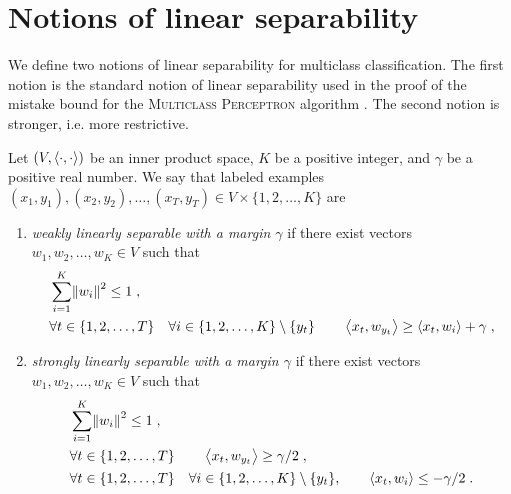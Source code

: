 \section{Notions of linear separability}
\label{section:notions-of-linear-separability}

We define two notions of linear separability for multiclass classification. The
first notion is the standard notion of linear separability used in the proof of
the mistake bound for the \textsc{Multiclass Perceptron} algorithm \citep[see e.g.][]{Crammer-Singer-2003}. The second
notion is stronger, i.e. more restrictive. %

\begin{definition}
\label{definition:linear-separability}
Let $(V,\left\langle \cdot, \cdot \right\rangle)$ be an inner product space, $K$ be a positive
integer, and $\gamma$ be a positive real number.
We say that labeled examples $(x_1, y_1),
(x_2, y_2), \dots, (x_T, y_T) \in V \times \{1,2,\dots,K\}$ are
\begin{enumerate}
\item
\emph{weakly linearly separable with a margin $\gamma$} if there exist vectors
$w_1, w_2, \dots, w_K \in V$ such that
\begin{align}
\label{equation:weak-linear-separability-1}
& \sum_{i=1}^K \norm{w_i}^2 \le 1 \; , \\
\label{equation:weak-linear-separability-2}
& \begin{gathered}
\forall t \in \{1,2,\dots,T\} \quad \forall i \in \{1,2,\dots, K\} \setminus \{y_t\} \qquad
\left\langle x_t, w_{y_t} \right\rangle \ge \left\langle x_t, w_i \right\rangle + \gamma \; ,
\end{gathered}
\end{align}
\item
\emph{strongly linearly separable with a margin $\gamma$} if there exist vectors
$w_1, w_2, \dots, w_K \in V$ such that
\begin{align}
\label{equation:strong-linear-separability-1}
& \sum_{i=1}^K \norm{w_i}^2 \le 1 \; , \\
\label{equation:strong-linear-separability-2}
& \forall t \in \{1,2,\dots,T\} \qquad \left\langle x_t, w_{y_t} \right\rangle \ge \gamma/2 \; , \\
\label{equation:strong-linear-separability-3}
& \begin{gathered}
\forall t \in \{1,2,\dots,T\} \quad \forall i \in \{1,2,\dots, K\} \setminus \{y_t\}, \qquad
\left\langle x_t, w_i \right\rangle \le - \gamma/2 \; .
\end{gathered}
\end{align}
\end{enumerate}
\end{definition}

